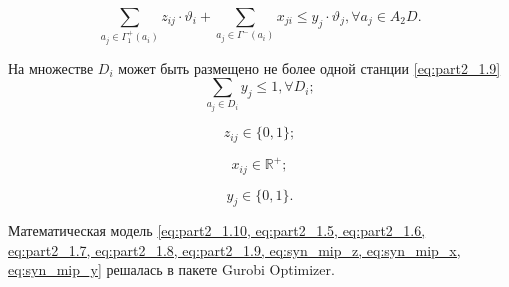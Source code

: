 \begin{equation}\label{eq:part2_1.8}
    \sum_{a_j \in \Gamma_1^+(a_i)} z_{ij} \cdot \vartheta_i + \sum_{a_j \in \Gamma^-(a_i)} x_{ji} \leqslant y_j \cdot \vartheta_j, \forall a_j \in A_2D.
\end{equation}



На множестве $D_i$ может быть размещено не более одной станции \cref{eq:part2_1.9}
\begin{equation}\label{eq:part2_1.9}
    \sum_{a_j \in D_i} y_j \leqslant 1, \forall D_i;
\end{equation}

\begin{equation}
    \label{eq:syn_mip_z}
    z_{ij} \in \{0, 1\};
\end{equation}

\begin{equation}
    \label{eq:syn_mip_x}
    x_{ij} \in \mathbb{R}^+;
\end{equation}

\begin{equation}
    \label{eq:syn_mip_y}
    y_{j} \in \{0, 1\}.
\end{equation}

Математическая модель \cref{eq:part2_1.10, eq:part2_1.5, eq:part2_1.6, eq:part2_1.7, eq:part2_1.8, eq:part2_1.9, eq:syn_mip_z, eq:syn_mip_x, eq:syn_mip_y} решалась в пакете Gurobi Optimizer.  






